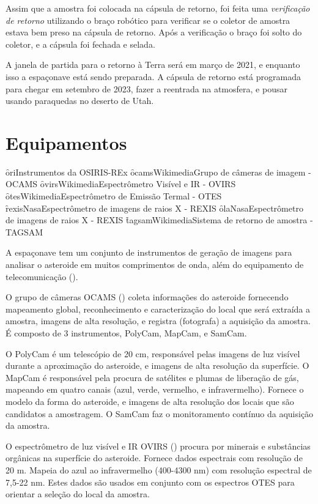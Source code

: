 Assim que a amostra foi colocada na cápsula de retorno, foi feita uma \textit{verificação de retorno} utilizando o braço robótico para verificar se o coletor de amostra estava bem preso na cápsula de retorno. Após a verificação o braço foi solto do coletor, e a cápsula foi fechada e selada.

A janela de partida para o retorno à Terra será em março de 2021, e enquanto isso a espaçonave está sendo preparada. A cápsula de retorno está programada para chegar em setembro de 2023, fazer a reentrada na atmosfera, e pousar usando paraquedas no deserto de Utah.

\section{Equipamentos} %

\f{ori}{}{Instrumentos da OSIRIS-REx}
\f{ocams}{Wikimedia}{Grupo de câmeras de imagem - OCAMS}
\f{ovirs}{Wikimedia}{Espectrômetro Visível e IR - OVIRS}
\f{otes}{Wikimedia}{Espectrômetro de Emissão Termal - OTES}
\f{rexis}{Nasa}{Espectrômetro de imagens de raios X - REXIS}
\f{ola}{Nasa}{Espectrômetro de imagens de raios X - REXIS}
\f{tagsam}{Wikimedia}{Sistema de retorno de amostra - TAGSAM}

A espaçonave tem um conjunto de instrumentos de geração de imagens para analisar o asteroide em muitos comprimentos de onda, além do equipamento de telecomunicação ().

O grupo de câmeras OCAMS () coleta informações do asteroide fornecendo mapeamento global, reconhecimento e caracterização do local que será extraída a amostra, imagens de alta resolução, e registra (fotografa) a aquisição da amostra. É composto de 3 instrumentos, PolyCam, MapCam, e SamCam. 

O PolyCam é um telescópio de 20 cm, responsável pelas imagens de luz visível durante a aproximação do asteroide, e imagens de alta resolução da superfície. O MapCam é responsável pela procura de satélites e plumas de liberação de gás, mapeando em quatro canais (azul, verde, vermelho, e infravermelho). Fornece o modelo da forma do asteroide, e imagens de alta resolução dos locais que são candidatos a amostragem. O SamCam faz o monitoramento contínuo da aquisição da amostra.

O espectrômetro de luz visível e IR OVIRS () procura por minerais e substâncias orgânicas na superfície do asteroide. Fornece dados espectrais com resolução de 20 m. Mapeia do azul ao infravermelho (400-4300 nm) com resolução espectral de 7,5-22 nm. Estes dados são usados em conjunto com os espectros OTES para orientar a seleção do local da amostra.

